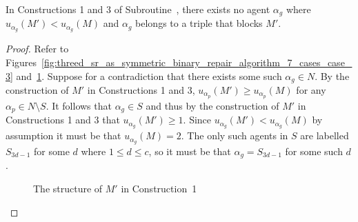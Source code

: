 \begin{lem}
\label{lem:threed_sr_as_symmetric_binary_algocases1and3noalphapexists}
In Constructions 1 and 3 of Subroutine~, there exists no agent $\alpha_{g}$ where $u_{\alpha_{g}}(M') < u_{\alpha_{g}}(M)$ and $\alpha_g$ belongs to a triple that blocks $M'$.
\end{lem}
\begin{proof}
Refer to Figures~\ref{fig:threed_sr_as_symmetric_binary_repair_algorithm_7_cases_case_3} and~\ref{fig:threed_sr_as_symmetric_binary_repair_algorithm_7_cases_case_1}. Suppose for a contradiction that there exists some such $\alpha_g\in N$. By the construction of $M'$ in Constructions 1 and 3, $u_{\alpha_p}(M')\geq u_{\alpha_p}(M)$ for any $\alpha_p\in N \setminus S$. It follows that $\alpha_g\in S$ and thus by the construction of $M'$ in Constructions 1 and 3 that $u_{\alpha_g}(M')\geq 1$. Since $u_{\alpha_{g}}(M') < u_{\alpha_{g}}(M)$ by assumption it must be that $u_{\alpha_g}(M) = 2$. The only such agents in $S$ are labelled $S_{3d-1}$ for some $d$ where $1 \leq d \leq c$, so it must be that $\alpha_g = S_{3d-1}$ for some such $d$. 

\begin{figure}
    \centering
    
    \caption{The structure of $M'$ in Construction~1} 
    \label{fig:threed_sr_as_symmetric_binary_repair_algorithm_7_cases_case_1}
\end{figure}


\end{proof}
